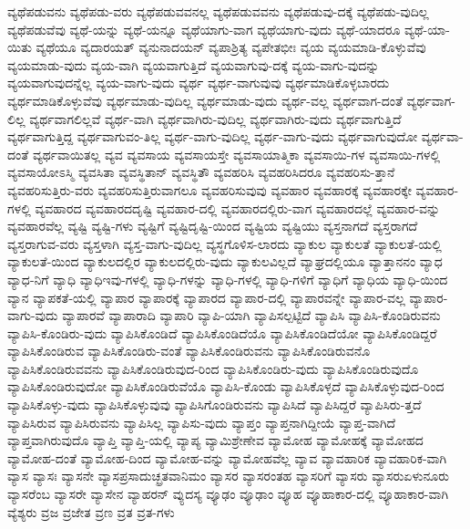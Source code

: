 {ವ್ಯಥೆಪಡುವನು
ವ್ಯಥೆಪಡು-ವರು
ವ್ಯಥೆಪಡುವವನಲ್ಲ
ವ್ಯಥೆಪಡುವವನು
ವ್ಯಥೆಪಡುವು-ದಕ್ಕೆ
ವ್ಯಥೆಪಡು-ವುದಿಲ್ಲ
ವ್ಯಥೆಪಡುವೆವು
ವ್ಯಥೆ-ಯನ್ನು
ವ್ಯಥೆ-ಯನ್ನೂ
ವ್ಯಥೆಯಾಗು-ವಾಗ
ವ್ಯಥೆಯಾಗು-ವುದು
ವ್ಯಥೆ-ಯಾದರೂ
ವ್ಯಥೆ-ಯಾ-ಯಿತು
ವ್ಯಥೆಯೂ
ವ್ಯದಾರಯತ್
ವ್ಯನುನಾದಯನ್
ವ್ಯಪಾಶ್ರಿತ್ಯ
ವ್ಯಪೇತಭೀಃ
ವ್ಯಯ
ವ್ಯಯಮಾಡಿ-ಕೊಳ್ಳುವೆವು
ವ್ಯಯಮಾಡು-ವುದು
ವ್ಯಯ-ವಾಗಿ
ವ್ಯಯವಾಗುತ್ತಿದೆ
ವ್ಯಯವಾಗುವು-ದಕ್ಕೆ
ವ್ಯಯ-ವಾಗು-ವುದನ್ನು
ವ್ಯಯವಾಗುವುದನ್ನೆಲ್ಲ
ವ್ಯಯ-ವಾಗು-ವುದು
ವ್ಯರ್ಥ
ವ್ಯರ್ಥ-ವಾಗುವುವು
ವ್ಯರ್ಥಮಾಡಿಕೊಳ್ಳಬಾರದು
ವ್ಯರ್ಥಮಾಡಿಕೊಳ್ಳುವೆವು
ವ್ಯರ್ಥಮಾಡು-ವುದಿಲ್ಲ
ವ್ಯರ್ಥಮಾಡು-ವುದು
ವ್ಯರ್ಥ-ವಲ್ಲ
ವ್ಯರ್ಥವಾಗ-ದಂತೆ
ವ್ಯರ್ಥವಾಗ-ಲಿಲ್ಲ
ವ್ಯರ್ಥವಾಗಲಿಲ್ಲವೆ
ವ್ಯರ್ಥ-ವಾಗಿ
ವ್ಯರ್ಥವಾಗಿರು-ವುದಿಲ್ಲ
ವ್ಯರ್ಥವಾಗಿರು-ವುದು
ವ್ಯರ್ಥವಾಗುತ್ತಿದೆ
ವ್ಯರ್ಥವಾಗುತ್ತಿದ್ದ
ವ್ಯರ್ಥವಾಗುವಂ-ತಿಲ್ಲ
ವ್ಯರ್ಥ-ವಾಗು-ವುದಿಲ್ಲ
ವ್ಯರ್ಥ-ವಾಗು-ವುದು
ವ್ಯರ್ಥವಾಗುವುದೋ
ವ್ಯರ್ಥವಾ-ದಂತೆ
ವ್ಯರ್ಥವಾಯಿತಲ್ಲ
ವ್ಯವ
ವ್ಯವಸಾಯ
ವ್ಯವಸಾಯಸ್ತೇ
ವ್ಯವಸಾಯಾತ್ಮಿಕಾ
ವ್ಯವಸಾಯಿ-ಗಳ
ವ್ಯವಸಾಯಿ-ಗಳಲ್ಲಿ
ವ್ಯವಸಾಯೋಽಸ್ಮಿ
ವ್ಯವಸಿತಾ
ವ್ಯವಸ್ಥಿತಾನ್
ವ್ಯವಸ್ಥಿತೌ
ವ್ಯವಹರಿಸಿ
ವ್ಯವಹರಿಸಿದರೂ
ವ್ಯವಹರಿಸು-ತ್ತಾನೆ
ವ್ಯವಹರಿಸುತ್ತಿರು-ವರು
ವ್ಯವಹರಿಸುತ್ತಿರುವಾಗಲೂ
ವ್ಯವಹರಿಸುವುವು
ವ್ಯವಹಾರ
ವ್ಯವಹಾರಕ್ಕೆ
ವ್ಯವಹಾರಕ್ಕೇ
ವ್ಯವಹಾರ-ಗಳಲ್ಲಿ
ವ್ಯವಹಾರದ
ವ್ಯವಹಾರದದೃಷ್ಟಿ
ವ್ಯವಹಾರ-ದಲ್ಲಿ
ವ್ಯವಹಾರದಲ್ಲಿರು-ವಾಗ
ವ್ಯವಹಾರದಲ್ಲೆ
ವ್ಯವಹಾರ-ವನ್ನು
ವ್ಯವಹಾರವೆಲ್ಲ
ವ್ಯಷ್ಟಿ
ವ್ಯಷ್ಟಿ-ಗಳು
ವ್ಯಷ್ಟಿಗೆ
ವ್ಯಷ್ಟಿದೃಷ್ಟಿ-ಯಿಂದ
ವ್ಯಷ್ಟಿಯ
ವ್ಯಷ್ಟಿಯು
ವ್ಯಸ್ತನಾಗದೆ
ವ್ಯಸ್ತರಾಗದೆ
ವ್ಯಸ್ತರಾಗುವ-ವರು
ವ್ಯಸ್ತಳಾಗಿ
ವ್ಯಸ್ತ-ವಾಗು-ವುದಿಲ್ಲ
ವ್ಯಸ್ಥಗೊಳಿಸ-ಲಾರದು
ವ್ಯಾಕುಲ
ವ್ಯಾಕುಲತೆ
ವ್ಯಾಕುಲತೆ-ಯಲ್ಲಿ
ವ್ಯಾಕುಲತೆ-ಯಿಂದ
ವ್ಯಾಕುಲದಲ್ಲಿರ
ವ್ಯಾಕುಲದಲ್ಲಿರು-ವುದು
ವ್ಯಾಕುಲವಿಲ್ಲದೆ
ವ್ಯಾಘ್ರದಲ್ಲಿಯೂ
ವ್ಯಾತ್ತಾನನಂ
ವ್ಯಾಧ
ವ್ಯಾಧ-ನಿಗೆ
ವ್ಯಾಧಿ
ವ್ಯಾಧಿಇವು-ಗಳಲ್ಲಿ
ವ್ಯಾಧಿ-ಗಳನ್ನು
ವ್ಯಾಧಿ-ಗಳಲ್ಲಿ
ವ್ಯಾಧಿ-ಗಳಿಗೆ
ವ್ಯಾಧಿಗೆ
ವ್ಯಾಧಿಯ
ವ್ಯಾಧಿ-ಯಿಂದ
ವ್ಯಾನ
ವ್ಯಾಪಕತೆ-ಯಲ್ಲಿ
ವ್ಯಾಪಾರ
ವ್ಯಾಪಾರಕ್ಕೆ
ವ್ಯಾಪಾರದ
ವ್ಯಾಪಾರ-ದಲ್ಲಿ
ವ್ಯಾಪಾರವನ್ನೇ
ವ್ಯಾಪಾರ-ವಲ್ಲ
ವ್ಯಾಪಾರ-ವಾಗು-ವುದು
ವ್ಯಾಪಾರವೆ
ವ್ಯಾಪಾರಾದಿ
ವ್ಯಾಪಾರಿ
ವ್ಯಾಪಿ-ಯಾಗಿ
ವ್ಯಾಪಿಸಲ್ಪಟ್ಟಿದೆ
ವ್ಯಾಪಿಸಿ
ವ್ಯಾಪಿಸಿ-ಕೊಂಡಿರುವನು
ವ್ಯಾಪಿಸಿ-ಕೊಂಡಿರು-ವುದು
ವ್ಯಾಪಿಸಿಕೊಂಡಿದೆ
ವ್ಯಾಪಿಸಿಕೊಂಡಿದೆಯೊ
ವ್ಯಾಪಿಸಿಕೊಂಡಿದೆಯೋ
ವ್ಯಾಪಿಸಿಕೊಂಡಿದ್ದರೆ
ವ್ಯಾಪಿಸಿಕೊಂಡಿರುವ
ವ್ಯಾಪಿಸಿಕೊಂಡಿರು-ವಂತೆ
ವ್ಯಾಪಿಸಿಕೊಂಡಿರುವನು
ವ್ಯಾಪಿಸಿಕೊಂಡಿರುವನೊ
ವ್ಯಾಪಿಸಿಕೊಂಡಿರುವವನು
ವ್ಯಾಪಿಸಿಕೊಂಡಿರುವುದ-ರಿಂದ
ವ್ಯಾಪಿಸಿಕೊಂಡಿರು-ವುದು
ವ್ಯಾಪಿಸಿಕೊಂಡಿರುವುದೊ
ವ್ಯಾಪಿಸಿಕೊಂಡಿರುವುದೋ
ವ್ಯಾಪಿಸಿಕೊಂಡಿರುವೆಯೊ
ವ್ಯಾಪಿಸಿ-ಕೊಂಡು
ವ್ಯಾಪಿಸಿಕೊಳ್ಳದೆ
ವ್ಯಾಪಿಸಿಕೊಳ್ಳುವುದ-ರಿಂದ
ವ್ಯಾಪಿಸಿಕೊಳ್ಳು-ವುದು
ವ್ಯಾಪಿಸಿಕೊಳ್ಳುವುವು
ವ್ಯಾಪಿಸಿಗೊಂಡಿರುವನು
ವ್ಯಾಪಿಸಿದೆ
ವ್ಯಾಪಿಸಿದ್ದರೆ
ವ್ಯಾಪಿಸಿರು-ತ್ತದೆ
ವ್ಯಾಪಿಸಿರುವ
ವ್ಯಾಪಿಸಿರುವನು
ವ್ಯಾಪಿಸಿಲ್ಲ
ವ್ಯಾಪಿಸು-ವುದು
ವ್ಯಾಪ್ತಂ
ವ್ಯಾಪ್ತನಾಗಿದ್ದೀಯೆ
ವ್ಯಾಪ್ತ-ವಾಗಿದೆ
ವ್ಯಾಪ್ತವಾಗಿರುವುದೊ
ವ್ಯಾಪ್ತಿ
ವ್ಯಾಪ್ತಿ-ಯಲ್ಲಿ
ವ್ಯಾಪ್ಯ
ವ್ಯಾಮಿಶ್ರೇಣೇವ
ವ್ಯಾಮೋಹ
ವ್ಯಾಮೋಹಕ್ಕೆ
ವ್ಯಾಮೋಹದ
ವ್ಯಾಮೋಹ-ದಂತೆ
ವ್ಯಾಮೋಹ-ದಿಂದ
ವ್ಯಾಮೋಹ-ವನ್ನು
ವ್ಯಾಮೋಹವೆಲ್ಲ
ವ್ಯಾವ
ವ್ಯಾವಹಾರಿಕ
ವ್ಯಾವಹಾರಿಕ-ವಾಗಿ
ವ್ಯಾಸ
ವ್ಯಾಸಃ
ವ್ಯಾಸನೇ
ವ್ಯಾಸಪ್ರಸಾದುಚ್ಛ್ರತವಾನಿಮಂ
ವ್ಯಾಸರ
ವ್ಯಾಸರಂತಹ
ವ್ಯಾಸರಿಗೆ
ವ್ಯಾಸರು
ವ್ಯಾಸರುಏಳುನೂರು
ವ್ಯಾಸರೆಂಬ
ವ್ಯಾಸರೇ
ವ್ಯಾಸೇನ
ವ್ಯಾಹರನ್
ವ್ಯುದಸ್ಯ
ವ್ಯೂಢಂ
ವ್ಯೂಢಾಂ
ವ್ಯೂಹ
ವ್ಯೂಹಾಕಾರ-ದಲ್ಲಿ
ವ್ಯೂಹಾಕಾರ-ವಾಗಿ
ವ್ಯೆಶ್ಯರು
ವ್ರಜ
ವ್ರಜೇತ
ವ್ರಣ
ವ್ರತ
ವ್ರತ-ಗಳು
}
